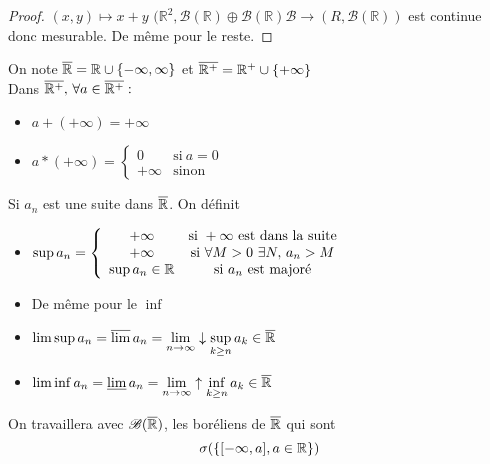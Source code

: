 \begin{proof}
	$(x,y) \mapsto x + y$
	$(\mathbb{R}^2, \mathscr{B}(\mathbb{R}) \oplus \mathscr{B}(\mathbb{R})  \mathscr{B} \rightarrow (R,   \mathscr{B}(\mathbb{R})) $
	est continue donc mesurable. De même pour le reste.
\end{proof}


\begin{definition}
	On note $\overline{\mathbb{R}} = \mathbb{R} \cup \{ -\infty, \infty \}$ et $\overline{\mathbb{R}^+} = \mathbb{R}^+ \cup \{  +\infty \}$\\
	Dans $\overline{\mathbb{R}^+} , \, \forall a \in \overline{\mathbb{R}^+}: $\\
	\begin{itemize}
		\item $a + (+\infty) = +\infty$
		\item
		      $a * (+\infty) = \left\{ \begin{array}{cc}
				      0       & \text{si} \  a = 0 \\
				      +\infty & \text{sinon}
			      \end{array}\right.$
	\end{itemize}
\end{definition}

\begin{definition}
	Si $a_n$ est une suite dans $\overline{\mathbb{R}}$. On définit
	\begin{itemize}
		\item $\sup a_n =
			      \left\{ \begin{array}{cc}
				      +\infty         & \text{si} \ +\infty \ \text{est dans la suite}   \\
				      +\infty         & \text{si} \ \forall M > 0 \ \exists N,\, a_n > M \\
				      \sup a_n \in \R & \text{si} \ a_n\  \text{est majoré}
			      \end{array}\right.$

		\item De même pour le $\inf$
		\item $\limsup a_n = \varlimsup a_n = \lim\limits_{n \to \infty}\downarrow \sup\limits_{k \geq n } a_k \in \overline{\mathbb{R}}$
		\item $\liminf a_n = \varliminf a_n = \lim\limits_{n \to \infty}\uparrow \inf\limits_{k \geq n } a_k \in \overline{\mathbb{R}}$
	\end{itemize}
\end{definition}


\begin{remarque}
	On travaillera avec $\mathscr{B}(\overline{\mathbb{R}})$, les boréliens de $\overline{\mathbb{R}}$ qui sont
	$$\sigma (\left\{[-\infty, a], a \in \mathbb{R}\right\})$$
\end{remarque}


